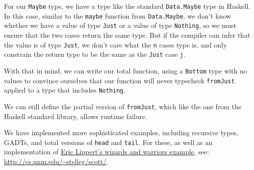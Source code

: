 \documentclass[]{article}
\newenvironment{Shaded}{}{}
\newcommand{\KeywordTok}[1]{\textcolor[rgb]{0.00,0.44,0.13}{\textbf{{#1}}}}
\newcommand{\DataTypeTok}[1]{\textcolor[rgb]{0.56,0.13,0.00}{{#1}}}
\newcommand{\StringTok}[1]{\textcolor[rgb]{0.25,0.44,0.63}{{#1}}}
\newcommand{\OtherTok}[1]{\textcolor[rgb]{0.00,0.44,0.13}{{#1}}}
\newcommand{\FunctionTok}[1]{\textcolor[rgb]{0.02,0.16,0.49}{{#1}}}
\newcommand{\NormalTok}[1]{{#1}}
\begin{document}
For our \texttt{Maybe} type, we have a type like the standard
\texttt{Data.Maybe} type in Haskell. In this case, similar to the
\texttt{maybe} function from \texttt{Data.Maybe}, we don't know whether
we have a value of type \texttt{Just} or a value of type
\texttt{Nothing}, so we must ensure that the two cases return the same
type. But if the compiler can infer that the value is of type
\texttt{Just}, we don't care what the \texttt{n} cases type is, and only
constrain the return type to be the same as the \texttt{Just} case
\texttt{j}.

With that in mind, we can write our total function, using a
\texttt{Bottom} type with no values to convince ourselves that our
function will never typecheck \texttt{fromJust} applied to a type that
includes \texttt{Nothing}.

\begin{Shaded}
\end{Shaded}

We can still define the partial version of \texttt{fromJust}, which like
the one from the Haskell standard library, allows runtime failure.

\begin{Shaded}
\end{Shaded}

We have implemented more sophisticated examples, including recursive
types, GADTs, and total versions of \texttt{head} and \texttt{tail}. For
these, as well as an implementation of
\href{http://ericlippert.com/2015/04/27/wizards-and-warriors-part-one/}{Eric
Lippert's wizards and warriors example}, see:
\href{http://cs.unm.edu/~stelleg/Scott/}{http://cs.unm.edu/\textasciitilde{}stelleg/scott/}.
\end{document}
